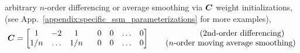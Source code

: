 arbitrary $n$-order differencing or average smoothing via $\boldsymbol{C}$ weight initializations, \eg{} (see App.~\ref{appendix:specific_ssm_parameterizations} for more examples),
\begin{align}
    \zC = 
    \begin{bmatrix}
    1 & -2 & 1 & \phantom{-}0 & 0 & \ldots & 0 \\
    1/n & \ldots & 1/n & \phantom{-}0 & 0 & \ldots & 0 \\
    \end{bmatrix}
    \;\;\;\;\;\;
    \begin{matrix}
    \hfill\text{ (2nd-order differencing)} \\
    \hfill\text{ ($n$-order moving average smoothing)}
    \end{matrix}
\end{align}



